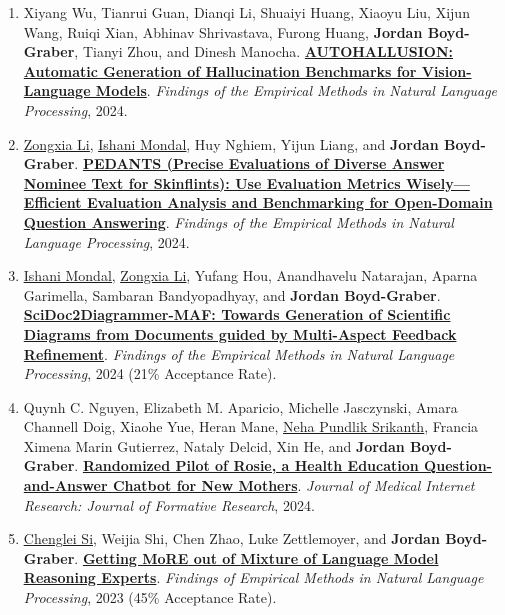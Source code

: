 {\begin{enumerate}
	 \item Xiyang Wu, Tianrui Guan, Dianqi Li, Shuaiyi Huang, Xiaoyu Liu, Xijun Wang, Ruiqi Xian, Abhinav Shrivastava, Furong Huang, {\bf Jordan Boyd-Graber}, Tianyi Zhou, and Dinesh Manocha.  {\bf \href{https://arxiv.org/abs/2406.10900}{AUTOHALLUSION: Automatic Generation of Hallucination Benchmarks for Vision-Language Models}}.  \emph{Findings of the Empirical Methods in Natural Language Processing}, 2024.

	 \item \underline{\href{https://zli12321.github.io/}{Zongxia Li}}, \underline{\href{https://ishani-mondal.github.io/}{Ishani Mondal}}, Huy Nghiem, Yijun Liang, and {\bf Jordan Boyd-Graber}.  {\bf \href{https://arxiv.org/abs/2402.11161}{PEDANTS (Precise Evaluations of Diverse Answer Nominee Text for Skinflints): Use Evaluation Metrics Wisely---Efficient Evaluation Analysis and Benchmarking for Open-Domain Question Answering}}.  \emph{Findings of the Empirical Methods in Natural Language Processing}, 2024.

	 \item \underline{\href{https://ishani-mondal.github.io/}{Ishani Mondal}}, \underline{\href{https://zli12321.github.io/}{Zongxia Li}}, Yufang Hou, Anandhavelu Natarajan, Aparna Garimella, Sambaran Bandyopadhyay, and {\bf Jordan Boyd-Graber}.  {\bf \href{http://cs.umd.edu/~jbg//docs/2024_emnlp_diagramgen.pdf}{SciDoc2Diagrammer-MAF: Towards Generation of Scientific Diagrams from Documents guided by Multi-Aspect Feedback Refinement}}.  \emph{Findings of the Empirical Methods in Natural Language Processing}, 2024 (21\% Acceptance Rate).

	 \item Quynh C. Nguyen,  Elizabeth M. Aparicio,  Michelle Jasczynski,  Amara Channell Doig,  Xiaohe Yue,  Heran Mane, \underline{\href{https://nehasrikn.github.io/}{Neha Pundlik Srikanth}}, Francia Ximena Marin Gutierrez, Nataly Delcid,  Xin He, and {\bf Jordan Boyd-Graber}.  {\bf \href{https://formative.jmir.org/2024/1/e51361}{Randomized Pilot of Rosie, a Health Education Question-and-Answer Chatbot for New Mothers}}.  \emph{Journal of Medical Internet Research: Journal of Formative Research}, 2024.

	 \item \underline{\href{https://noviscl.github.io}{Chenglei Si}}, Weijia Shi, Chen Zhao, Luke Zettlemoyer, and {\bf Jordan Boyd-Graber}.  {\bf \href{http://cs.umd.edu/~jbg//docs/2023_findings_more.pdf}{Getting \underline{MoRE} out of \underline{M}ixture \underline{o}f Language Model \underline{R}easoning \underline{E}xperts}}.  \emph{Findings of Empirical Methods in Natural Language Processing}, 2023 (45\% Acceptance Rate).


\end{enumerate}}
